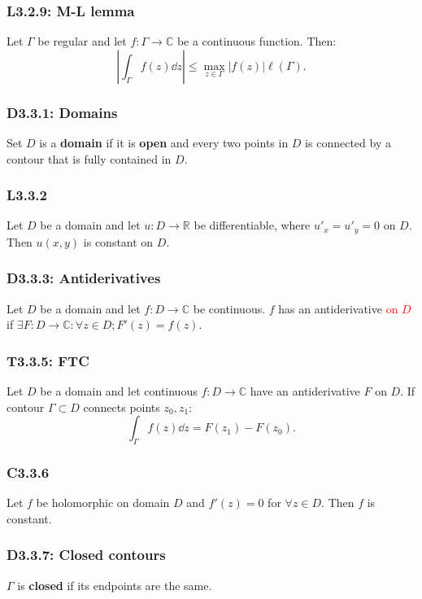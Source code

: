 \documentclass{article}
\begin{document}
\begin{multicols*}{3}
\subsubsection*{L3.2.9: M-L lemma}
Let $\Gamma$ be regular and let $f:\Gamma\rightarrow\mathbb{C}$
be a continuous function. Then:
$$\left|\int_{\Gamma}f(z)\dd z
\right|\leq\max_{z\in\Gamma}|f(z)|\ell(\Gamma).$$

\subsubsection*{D3.3.1: Domains}
Set $D$ is a \textbf{domain} if it is \textbf{open} and
every two points in $D$ is connected by a contour that
is fully contained in $D$.

\subsubsection*{L3.3.2}
Let $D$ be a domain and let $u:D\rightarrow\mathbb{R}$
be differentiable, where $u'_x=u'_y=0$ on $D$. Then $u(x,y)$
is constant on $D$.

\subsubsection*{D3.3.3: Antiderivatives}
Let $D$ be a domain and let $f:D\rightarrow\mathbb{C}$ be
continuous. $f$ has an antiderivative \textcolor{red}{on $D$} if
$\exists F:D\rightarrow\mathbb{C}:\forall z\in D; F'(z)=f(z)$.

\subsubsection*{T3.3.5: FTC}
Let $D$ be a domain and let continuous $f:D\rightarrow\mathbb{C}$
have an antiderivative $F$ on $D$. If contour $\Gamma\subset D$
connects points $z_0,z_1$:
$$\int_{\Gamma}f(z)\dd z=F(z_1)-F(z_0).$$

\subsubsection*{C3.3.6}
Let $f$ be holomorphic on domain $D$ and
$f'(z)=0$ for $\forall z\in D$. Then $f$ is constant.

\subsubsection*{D3.3.7: Closed contours}
$\Gamma$ is \textbf{closed} if its endpoints are the same.


\end{multicols*}
\end{document}
